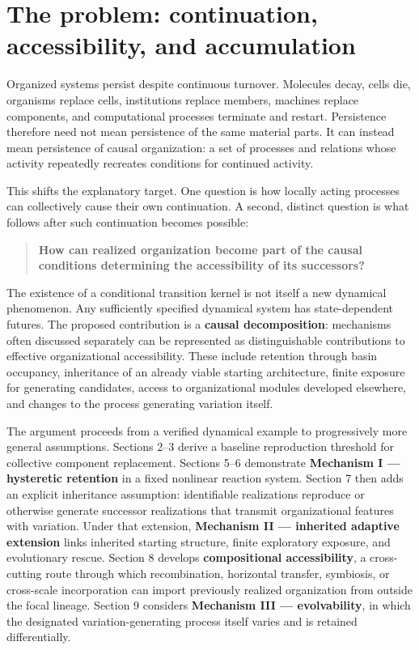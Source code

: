 \documentclass[11pt,a4paper]{article}
\begin{document}
\section{The problem: continuation, accessibility, and accumulation}

Organized systems persist despite continuous turnover. Molecules decay, cells die, organisms replace cells, institutions replace members, machines replace components, and computational processes terminate and restart. Persistence therefore need not mean persistence of the same material parts. It can instead mean persistence of causal organization: a set of processes and relations whose activity repeatedly recreates conditions for continued activity.

This shifts the explanatory target. One question is how locally acting processes can collectively cause their own continuation. A second, distinct question is what follows after such continuation becomes possible:

\begin{quote}
\textbf{How can realized organization become part of the causal conditions determining the accessibility of its successors?}
\end{quote}

The existence of a conditional transition kernel is not itself a new dynamical phenomenon. Any sufficiently specified dynamical system has state-dependent futures. The proposed contribution is a \textbf{causal decomposition}: mechanisms often discussed separately can be represented as distinguishable contributions to effective organizational accessibility. These include retention through basin occupancy, inheritance of an already viable starting architecture, finite exposure for generating candidates, access to organizational modules developed elsewhere, and changes to the process generating variation itself.

The argument proceeds from a verified dynamical example to progressively more general assumptions. Sections 2--3 derive a baseline reproduction threshold for collective component replacement. Sections 5--6 demonstrate \textbf{Mechanism I --- hysteretic retention} in a fixed nonlinear reaction system. Section 7 then adds an explicit inheritance assumption: identifiable realizations reproduce or otherwise generate successor realizations that transmit organizational features with variation. Under that extension, \textbf{Mechanism II --- inherited adaptive extension} links inherited starting structure, finite exploratory exposure, and evolutionary rescue. Section 8 develops \textbf{compositional accessibility}, a cross-cutting route through which recombination, horizontal transfer, symbiosis, or cross-scale incorporation can import previously realized organization from outside the focal lineage. Section 9 considers \textbf{Mechanism III --- evolvability}, in which the designated variation-generating process itself varies and is retained differentially.
\end{document}
